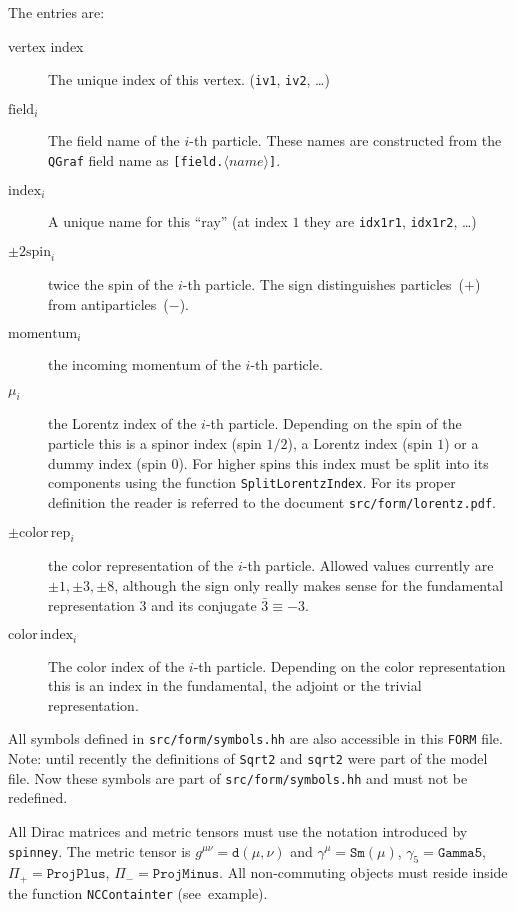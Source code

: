 \documentclass[11pt,a4paper]{refrep}
\newcommand{\qgraf}{{\tt QGraf}\xspace}
\newcommand{\form}{{\tt FORM}\xspace}
\begin{document}
The entries are:
\begin{description}
\item[vertex index] The unique index of this vertex. (\texttt{iv1}, \texttt{iv2}, \dots)
\item[$\mathrm{field}_i$] The field name of the $i$-th particle. These names are constructed
from the \qgraf{} field name as \texttt{[field.$\langle name\rangle$]}.
\item[$\mathrm{index}_i$] A unique name for this ``ray'' (at index $1$ they are \texttt{idx1r1},
   \texttt{idx1r2}, \ldots)
\item[$\pm2\mathrm{spin}_i$] twice the spin of the $i$-th particle.
   The sign distinguishes particles~($+$) from antiparticles~($-$).
\item[$\mathrm{momentum}_i$] the incoming momentum of the $i$-th particle.
\item[$\mu_i$] the Lorentz index of the $i$-th particle. Depending on the spin of the particle
   this is a spinor index (spin $1/2$), a Lorentz index (spin $1$) or a dummy index (spin $0$).
   For higher spins this index must be split into its components using the function
   \texttt{SplitLorentzIndex}. For its proper definition the reader is referred to
   the document \texttt{src/form/lorentz.pdf}.
\item[$\pm\mathrm{color\,rep}_i$] the color representation of the $i$-th particle. Allowed
   values currently are $\pm1,\pm3,\pm8$, although the sign only really makes sense for the
   fundamental representation $3$ and its conjugate $\bar{3}\equiv-3$.
\item[$\mathrm{color\,index}_i$] The color index of the $i$-th particle. Depending on the color
   representation this is an index in the fundamental, the adjoint or the trivial representation.
\end{description}

All symbols defined in \texttt{src/form/symbols.hh} are also accessible in this \form{} file.
\attention Note: until recently the definitions of \texttt{Sqrt2} and \texttt{sqrt2} were part
of the model file. Now these symbols are part of \texttt{src/form/symbols.hh} and must not be
redefined.

\attention All Dirac matrices and metric tensors must use the notation introduced by \texttt{spinney}.
The metric tensor is $g^{\mu\nu}=\mathtt{d}(\mu, \nu)$ and $\gamma^\mu=\mathtt{Sm}(\mu)$,
$\gamma_5=\mathtt{Gamma5}$, $\Pi_+=\mathtt{ProjPlus}$, $\Pi_-=\mathtt{ProjMinus}$. All non-commuting
objects must reside inside the function \texttt{NCContainter} (see~example).
\end{document}

